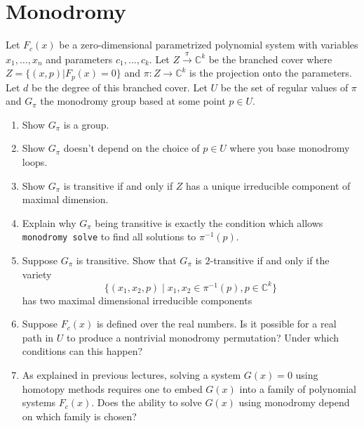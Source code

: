 \documentclass[11pt,reqno]{amsart}
\theoremstyle{definition}
\theoremstyle{remark}
\numberwithin{equation}{section}
\newcommand{\C}{\mathbb{C}}
\begin{document}
\section{Monodromy}
Let $F_c(x)$ be a zero-dimensional parametrized polynomial system with variables $x_1,\ldots,x_n$ and parameters $c_1,\ldots,c_k$. Let $Z \xrightarrow{\pi} \C^k$ be the branched cover where $Z=\{(x,p) | F_p(x)=0\}$ and $\pi:Z \to \C^k$ is the projection onto the parameters. Let $d$ be the degree of this branched cover.
Let $U$ be the set of regular values of $\pi$ and $G_\pi$ the monodromy group based at some point $p \in U$.

\begin{enumerate}
\item Show $G_\pi$ is a group.

\item Show $G_\pi$ doesn't depend on the choice of $p \in U$ where you base monodromy loops.


\item Show $G_\pi$ is transitive if and only if $Z$ has a unique irreducible component of maximal dimension.

\item Explain why $G_\pi$ being transitive is exactly the condition which allows \texttt{monodromy solve} to find all solutions to $\pi^{-1}(p)$.

\item Suppose $G_\pi$ is transitive. Show that $G_\pi$ is $2$-transitive if and only if the variety
$$\{(x_1,x_2,p) \mid x_1,x_2 \in \pi^{-1}(p), p \in \C^k \}$$
has two maximal dimensional irreducible components

\item Suppose $F_c(x)$ is defined over the real numbers.
 Is it possible for a real path in $U$ to produce a nontrivial monodromy permutation? Under which conditions can this happen?

\item As explained in previous lectures, solving a system $G(x)=0$ using homotopy methods requires one to embed $G(x)$ into a family of polynomial systems $F_c(x)$. Does the ability to solve $G(x)$ using monodromy depend on which family is chosen?


\end{enumerate}
\end{document}
